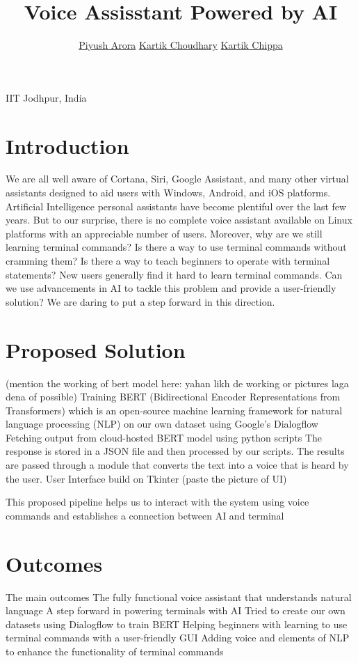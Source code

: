 \documentclass{article}
\title{ \LARGE Voice Assisstant Powered by AI
        }
\author{\href{mailto:arora.8@iitj.ac.in}{Piyush Arora} \vspace*{1} \href{mailto:arora.8@iitj.ac.in}{Kartik Choudhary} \vspace*{1} \href{mailto:arora.8@iitj.ac.in}{Kartik Chippa}}
\date{\vspace{-5ex}} %
\begin{document}
\maketitle
\thispagestyle{firstpage}



\begin{center}
    \large IIT Jodhpur, India
\end{center}

\section*{Introduction}
We are all well aware of Cortana, Siri, Google Assistant, and many other virtual assistants designed to aid users with Windows, Android, and iOS platforms. Artificial Intelligence personal assistants have become plentiful over the last few years. 
But to our surprise, there is no complete voice assistant available on Linux platforms with an appreciable number of users. 
Moreover, why are we still learning terminal commands? Is there a way to use terminal commands without cramming them? Is there a way to teach beginners to operate with terminal statements? New users generally find it hard to learn terminal commands. Can we use advancements in AI to tackle this problem and provide a user-friendly solution? 
We are daring to put a step forward in this direction.

\section*{Proposed Solution}
(mention the working of bert model here: yahan likh de working or pictures laga dena of possible)
Training BERT (Bidirectional Encoder Representations from Transformers) which is an open-source machine learning framework for natural language processing (NLP) on our own dataset using Google's Dialogflow
Fetching output from cloud-hosted BERT model using python scripts
The response is stored in a JSON file and then processed by our scripts.
The results are passed through a module that converts the text into a voice that is heard by the user.
User Interface build on Tkinter 
(paste the picture of UI)

This proposed pipeline helps us to interact with the system using voice commands and establishes a connection between AI and terminal

\section*{Outcomes}
The main outcomes The fully functional voice assistant that understands natural language
A step forward in powering terminals with AI
Tried to create our own datasets using Dialogflow to train BERT
Helping beginners with learning to use terminal commands with a user-friendly GUI
Adding voice and elements of NLP to enhance the functionality of terminal commands
\end{document}
